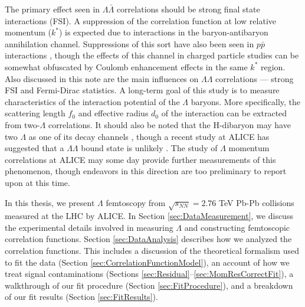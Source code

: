 The primary effect seen in $\Lambda\bar{\Lambda}$ correlations should be strong final state interactions (FSI).  
A suppression of the correlation function at low relative momentum ($k^*$) is expected due to interactions in the baryon-antibaryon annihilation channel.  
Suppressions of this sort have also been seen in $p \bar{p}$ interactions \cite{Gos:2007cj}, though the effects of this channel in charged particle studies can be somewhat obfuscated by Coulomb enhancement effects in the same $k^*$ region.  
Also discussed in this note are the main influences on $\Lambda\Lambda$ correlations --- strong FSI and Fermi-Dirac statistics.  
A long-term goal of this study is to measure characteristics of the interaction potential of the $\Lambda$ baryons.  
More specifically, the scattering length $f_0$ and effective radius $d_0$ of the interaction can be extracted from two-$\Lambda$ correlations. 
It should also be noted that the H-dibaryon may have two $\Lambda$ as one of its decay channels \cite{PhysRevLett.38.195}, though a recent study at ALICE has suggested that a $\Lambda\Lambda$ bound state is unlikely \cite{...}.  
The study of $\Lambda$ momentum correlations at ALICE may some day provide further measurements of this phenomenon, though endeavors in this direction are too preliminary to report upon at this time.








In this thesis, we present $\Lambda$ femtoscopy from $\sqrt{s_{NN}}=2.76$ TeV Pb-Pb collisions measured at the LHC by ALICE.
In Section \ref{sec:DataMeasurement}, we discuss the experimental details involved in measuring $\Lambda$ and constructing femtoscopic correlation functions.
Section \ref{sec:DataAnalysis} describes how we analyzed the correlation functions.
This includes a discussion of the theoretical formalism used to fit the data (Section \ref{sec:CorrelationFunctionModel}), an account of how we treat signal contaminations (Sections \ref{sec:Residual}--\ref{sec:MomResCorrectFit}), a walkthrough of our fit procedure (Section \ref{sec:FitProcedure}), and a breakdown of our fit results (Section \ref{sec:FitResults}).





